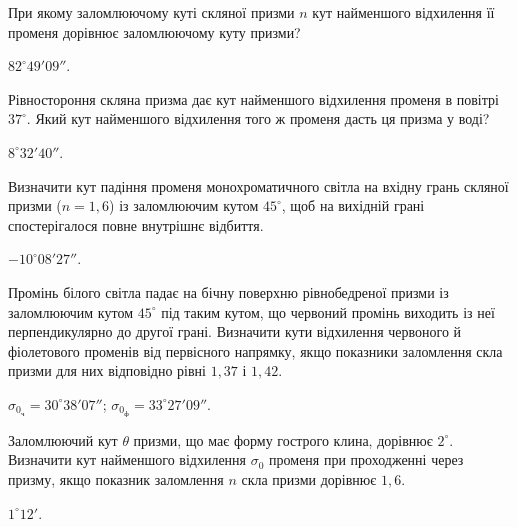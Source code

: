\begin{problem}
При якому заломлюючому куті скляної призми $n$ кут найменшого
відхилення її променя дорівнює заломлюючому куту призми?
\begin{solution}
	$82^\circ49'09''$.
\end{solution}
\end{problem}

\begin{problem}
Рівностороння скляна призма дає кут найменшого відхилення променя
в повітрі $37^\circ$. Який кут найменшого відхилення того ж променя дасть ця
призма у воді?
\begin{solution}
	$8^\circ32'40''$.
\end{solution}
\end{problem}

\begin{problem}
Визначити кут падіння променя монохроматичного світла на вхідну
грань скляної призми ($n = 1,6$) із заломлюючим кутом $45^\circ$, щоб на
вихідній грані спостерігалося повне внутрішнє відбиття.
\begin{solution}
	$-10^\circ08'27''$.
\end{solution}
\end{problem}

\begin{problem}
Промінь білого світла падає на бічну поверхню рівнобедреної призми
із заломлюючим кутом $45^\circ$ під таким кутом, що червоний промінь
виходить із неї перпендикулярно до другої грані. Визначити кути
відхилення червоного й фіолетового променів від первісного напрямку,
якщо показники заломлення скла призми для них відповідно рівні $1,37$ і
$1,42$.
\begin{solution}
	$\sigma_{0_\text{ч}} = 30^\circ38'07''$; $\sigma_{0_\text{ф}} = 33^\circ27'09''$.
\end{solution}
\end{problem}

\begin{problem}
Заломлюючий кут $\theta$ призми, що має форму гострого клина, дорівнює
$2^\circ$. Визначити кут найменшого відхилення $\sigma_0$ променя при
проходженні через призму, якщо показник заломлення $n$ скла призми
дорівнює $1,6$.
\begin{solution}
	$1^\circ12'$.
\end{solution}
\end{problem}

